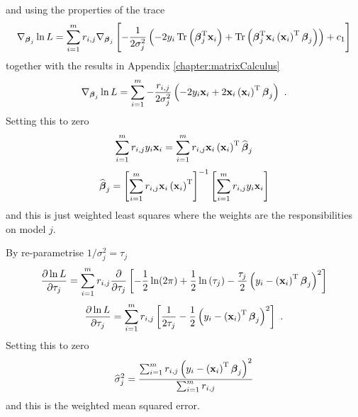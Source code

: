 \documentclass[12pt]{report}
\DeclareMathOperator{\trace}{Tr}
\newcommand{\T}{^\textup{T}}
\newcommand{\vect}[1]{\mathbf{#1}}
\newcommand{\vectGreek}[1]{\boldsymbol{#1}}
\begin{document}
and using the properties of the trace
\begin{equation*}
\nabla_{\vectGreek{\beta}_j}\ln{L}
=\sum_{i=1}^{m}
r_{i,j}
\nabla_{\vectGreek{\beta}_j}
\left[-\frac{1}{2\sigma_j^2}\left(-2y_i\trace\left(\vectGreek{\beta}_j\T\vect{x}_i\right)
+\trace\left(\vectGreek{\beta}_j\T\vect{x}_i\left(\vect{x}_i\right)\T\vectGreek{\beta}_j
\right)\right)
+c_1
\right]
\end{equation*}
together with the results in Appendix \ref{chapter:matrixCalculus}
\begin{equation}
\nabla_{\vectGreek{\beta}_j}\ln{L}
=\sum_{i=1}^{m}
-\frac{r_{i,j}}{2\sigma_j^2}
\left(-2y_i\vect{x}_i
+2\vect{x}_i\left(\vect{x}_i\right)\T\vectGreek{\beta}_j
\right) \ .
\end{equation}
Setting this to zero
\begin{equation*}
\sum_{i=1}^{m}
r_{i,j}
y_i\vect{x}_i
=
\sum_{i=1}^{m}r_{i,j}
\vect{x}_i\left(\vect{x}_i\right)\T\widehat{\vectGreek{\beta}}_j
\end{equation*}
\begin{equation}
\widehat{\vectGreek{\beta}}_j
=
\left[\sum_{i=1}^{m}r_{i,j}
\vect{x}_i\left(\vect{x}_i\right)\T\right]^{-1}
\left[\sum_{i=1}^{m}
r_{i,j}
y_i\vect{x}_i\right]
\end{equation}
and this is just weighted least squares where the weights are the responsibilities on model $j$.

By re-parametrise $1/\sigma_j^2=\tau_j$
\begin{equation*}
\frac{\partial\ln{L}}{\partial\tau_j}
=\sum_{i=1}^{m}
r_{i,j}
\frac{\partial}{\partial\tau_j}
\left[
	-\frac{1}{2}\ln(2\pi) + \frac{1}{2}\ln\left(\tau_j\right)-\frac{\tau_j}{2}\left({y_i-\left(\vect{x}_i\right)\T\vectGreek{\beta}_j}\right)^2
\right]
\end{equation*}
\begin{equation}
\frac{\partial\ln{L}}{\partial\tau_j}
=\sum_{i=1}^{m}
r_{i,j}
\left[\frac{1}{2\tau_j}-\frac{1}{2}\left({y_i-\left(\vect{x}_i\right)\T\vectGreek{\beta}_j}\right)^2
\right] \ .
\end{equation}
Setting this to zero
\begin{equation}
\widehat{\sigma}_j^2
=
\frac{\sum_{i=1}^{m}
r_{i,j}\left({y_i-\left(\vect{x}_i\right)\T\vectGreek{\beta}_j}\right)^2}
{\sum_{i=1}^{m}r_{i,j}}
\end{equation}
and this is the weighted mean squared error.
\end{document}

